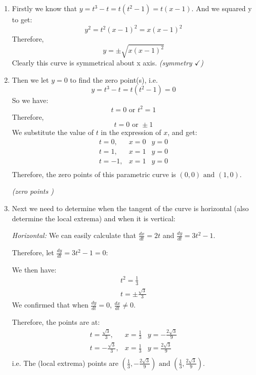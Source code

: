 \documentclass[12pt]{report}
\begin{document}
\begin{enumerate}
    \item Firstly we know that $y = t^3 - t = t(t^2 - 1) = t(x - 1)$.
    \newline And we squared y to get:
    $$
    y^2 = t^2(x - 1)^2 = x(x - 1)^2
    $$
    Therefore, 
    $$
    y = \pm \sqrt{x(x - 1)^2}
    $$
    Clearly this curve is symmetrical about x axis. \emph{(symmetry $\checkmark$)}
    \item Then we let $y = 0$ to find the zero point(s), i.e.
    $$
    y = t^3 - t = t(t^2 - 1) = 0
    $$
    So we have:
    $$
    t = 0 \text{ or } t^2 = 1
    $$
    Therefore, $$
    t = 0 \text{ or } \pm 1
    $$
    We substitute the value of $t$ in the expression of $x$, and get:
    $$
    \begin{array}{lll}
        t = 0, & x = 0 & y = 0 \\
        t = 1, & x = 1 & y = 0 \\
        t = -1, & x = 1 & y = 0 \\
    \end{array}
    $$
    Therefore, the zero points of this parametric curve is $(0, 0) \text{ and } (1, 0)$.
    
    \emph{(zero points \checkmark)}

    \item Next we need to determine when the tangent of the curve is horizontal 
    (also determine the local extrema) and when it is vertical:

    \emph{Horizontal:} We can easily calculate that $\frac{dx}{dt} = 2t$ and $\frac{dy}{dt} = 3t^2 - 1$.

    Therefore, let $\frac{dy}{dt} = 3t^2 - 1 = 0$:
    
    We then have:
    $$
    \begin{array}{l}
        t^2 = \frac{1}{3} \\
        t = \pm \frac{\sqrt{3}}{3}
    \end{array}
    $$
    We confirmed that when $\frac{dy}{dt} = 0$, $\frac{dx}{dt} \neq 0$.

    Therefore, the points are at:
    $$
    \begin{array}{lll}
        t = \frac{\sqrt{3}}{3}, & x = \frac{1}{3} & y = -\frac{2 \sqrt{3}}{9} \\
        t = -\frac{\sqrt{3}}{3}, & x = \frac{1}{3} & y = \frac{2 \sqrt{3}}{9} \\
    \end{array}
    $$
    i.e. The (local extrema) points are $(\frac{1}{3}, -\frac{2\sqrt{3}}{9}) \text{ and } (\frac{1}{3}, \frac{2\sqrt{3}}{9})$.
    

\end{enumerate}
\end{document}
